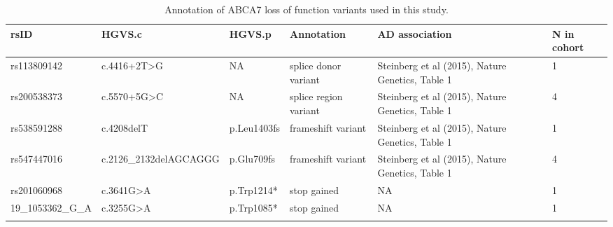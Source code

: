 \documentclass[12pt]{article}
\begin{document}
\clearpage
\begin{longtable}{p{3.5cm} p{4.7cm} p{3cm} p{2.5cm} p{2.3cm} p{1cm}}
    \caption{Annotation of ABCA7 loss of function variants used in this study.}
    \hline
    \textbf{rsID}          & \textbf{HGVS.c}           & \textbf{HGVS.p}    & \textbf{Annotation}                                                           & \textbf{AD association}                                                                   & \textbf{N in cohort} \\
    \hline
    \hline
    rs113809142            & c.4416+2T>G               & NA                 & splice donor variant \cite{Allen2017-on}                                      & Steinberg et al (2015), Nature Genetics, Table 1 \cite{Steinberg2015-vj}                   & 1 \\
    \hline
    rs200538373            & c.5570+5G>C               & NA                 & splice region variant \cite{Allen2017-on,Steinberg2015-vj}                    & Steinberg et al (2015), Nature Genetics, Table 1 \cite{Steinberg2015-vj}                   & 4 \\
    \hline
    rs538591288            & c.4208delT                & p.Leu1403fs        & frameshift variant \cite{Allen2017-on}                                        & Steinberg et al (2015), Nature Genetics, Table 1 \cite{Steinberg2015-vj}                   & 1 \\
    \hline
    rs547447016            & c.2126\_2132delAGCAGGG    & p.Glu709fs         & frameshift variant \cite{Allen2017-on}                                        & Steinberg et al (2015), Nature Genetics, Table 1 \cite{Steinberg2015-vj}                   & 4 \\
    \hline
    rs201060968            & c.3641G>A                & p.Trp1214*         & stop gained                                                                   & NA                                                                                        & 1 \\
    \hline
    19\_1053362\_G\_A       & c.3255G>A                & p.Trp1085*         & stop gained                                                                   & NA                                                                                        & 1 \\
    \hline
    \label{tab:annotation_abca7}
\end{longtable}
\end{document}
